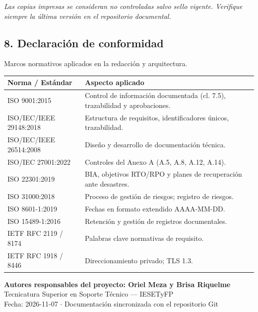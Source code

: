 \documentclass[10pt,a4paper]{article}
\begin{document}
{\footnotesize\textit{Las copias impresas se consideran no controladas salvo sello vigente. Verifique siempre la última versión en el repositorio documental.}}

\newpage
\subsection*{8. Declaración de conformidad}
Marcos normativos aplicados en la redacción y arquitectura.

\begin{table}[htbp]
\centering
\small
\begin{tabular}{|p{5.5cm}|p{10.5cm}|}
\hline
\textbf{\textsf{Norma / Estándar}} & \textbf{\textsf{Aspecto aplicado}} \\
\hline
ISO 9001:2015 & Control de información documentada (cl. 7.5), trazabilidad y aprobaciones. \\
\hline
ISO/IEC/IEEE 29148:2018 & Estructura de requisitos, identificadores únicos, trazabilidad. \\
\hline
ISO/IEC/IEEE 26514:2008 & Diseño y desarrollo de documentación técnica. \\
\hline
ISO/IEC 27001:2022 & Controles del Anexo A (A.5, A.8, A.12, A.14). \\
\hline
ISO 22301:2019 & BIA, objetivos RTO/RPO y planes de recuperación ante desastres. \\
\hline
ISO 31000:2018 & Proceso de gestión de riesgos; registro de riesgos. \\
\hline
ISO 8601-1:2019 & Fechas en formato extendido AAAA-MM-DD. \\
\hline
ISO 15489-1:2016 & Retención y gestión de registros documentales. \\
\hline
IETF RFC 2119 / 8174 & Palabras clave normativas de requisito. \\
\hline
IETF RFC 1918 / 8446 & Direccionamiento privado; TLS 1.3. \\
\hline
\end{tabular}
\end{table}

\vspace{1.5cm}
\begin{center}
\textbf{Autores responsables del proyecto: Oriel Meza y Brisa Riquelme}\\[0.15cm]
Tecnicatura Superior en Soporte Técnico — IESETyFP\\[0.15cm]
Fecha: 2026-11-07 $\cdot$ Documentación sincronizada con el repositorio Git
\end{center}
\end{document}
